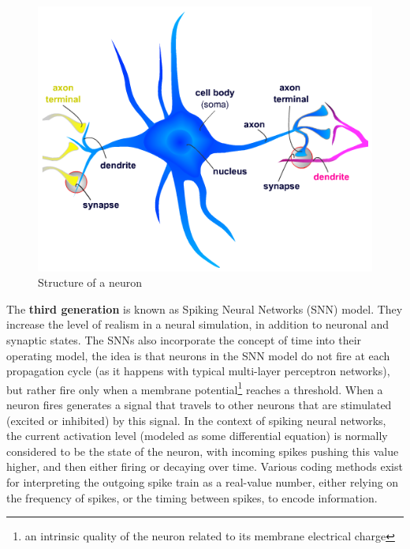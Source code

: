 \begin{figure}[ht]
    \centering
    \includegraphics[scale=0.6]{images/Figure2NeuronStructure.png}
    \caption{Structure of a neuron}
    \label{fig:NeuronStructure}
\end{figure}

The \textbf{third generation} is known as Spiking Neural Networks (SNN) model. They increase the level of realism in a neural simulation, in addition to neuronal and synaptic states. The SNNs also incorporate the concept of time into their operating model, the idea is that neurons in the SNN model do not fire at each propagation cycle (as it happens with typical multi-layer perceptron networks), but rather fire only when a membrane potential\footnote{an intrinsic quality of the neuron related to its membrane electrical charge} reaches a threshold. When a neuron fires generates a signal that travels to other neurons that are stimulated (excited or inhibited) by this signal. In the context of spiking neural networks, the current activation level (modeled as some differential equation) is normally considered to be the state of the neuron, with incoming spikes pushing this value higher, and then either firing or decaying over time. Various coding methods exist for interpreting the outgoing spike train as a real-value number, either relying on the frequency of spikes, or the timing between spikes, to encode information.

